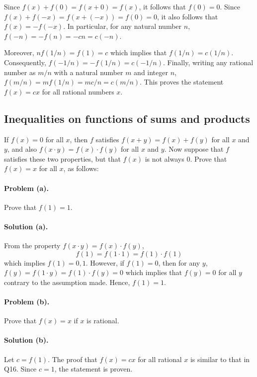 \documentclass{article}
\begin{document}
Since $f(x) + f(0) = f(x + 0) = f(x)$, it follows that $f(0) = 0$. Since $f(x) + f(-x) = f(x + (-x)) = f(0) = 0$, it also follows that $f(x) = -f(-x)$. In particular, for any natural number $n$, $f(-n) = -f(n) = -cn = c(-n)$.

Moreover, $nf(1/n) = f(1) = c$ which implies that $f(1/n) = c(1/n)$. Consequently, $f(-1/n) = -f(1/n) = c(-1/n)$. Finally, writing any rational number as $m/n$ with a natural number $m$ and integer $n$, $f(m/n) = mf(1/n) = mc/n = c(m/n)$. This proves the statement $f(x) = cx$ for all rational numbers $x$.

\setcounter{subsection}{16}
\subsection{Inequalities on functions of sums and products}

If $f(x) = 0$ for all $x$, then $f$ satisfies $f(x + y) = f(x) + f(y)$ for all $x$ and $y$, and also $f(x \cdot y) = f(x) \cdot f(y)$ for all $x$ and $y$. Now suppose that $f$ satisfies these two properties, but that $f(x)$ is not always 0. Prove that $f(x) = x$ for all $x$, as follows:

\paragraph{Problem (a).} Prove that $f(1) = 1$.

\paragraph{Solution (a).} From the property $f(x \cdot y) = f(x) \cdot f(y)$, \begin{equation*}
  f(1) = f(1 \cdot 1) = f(1) \cdot f(1)
\end{equation*} which implies $f(1) = 0, 1$. However, if $f(1) = 0$, then for any $y$, $f(y) = f(1 \cdot y) = f(1) \cdot f(y) = 0$ which implies that $f(y) = 0$ for all $y$ contrary to the assumption made. Hence, $f(1) = 1$.

\paragraph{Problem (b).} Prove that $f(x) = x$ if $x$ is rational.

\paragraph{Solution (b).} Let $c = f(1)$. The proof that $f(x) = cx$ for all rational $x$ is similar to that in Q16. Since $c = 1$, the statement is proven.
\end{document}
